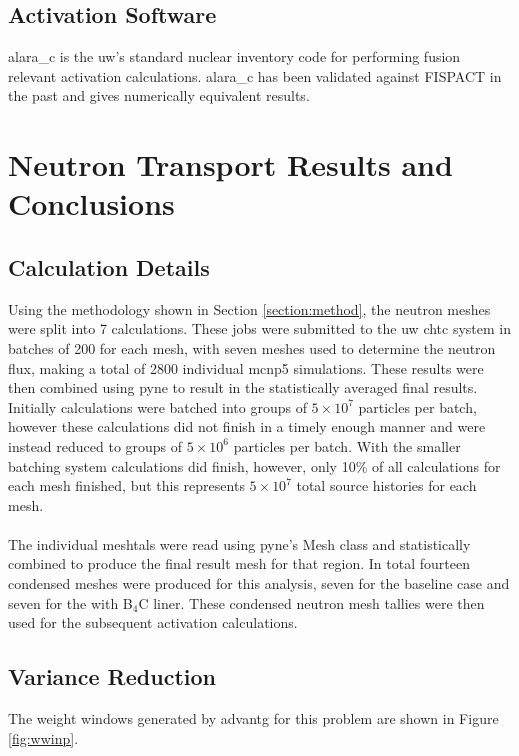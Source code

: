 \documentclass[12pt]{article}
\begin{document}
\subsection{Activation Software}
\gls{alara_c} is the \gls{uw}'s standard nuclear inventory code for performing
fusion relevant activation calculations. \gls{alara_c} has been validated against 
FISPACT \cite{fispact} in the past and gives numerically equivalent results. 

\newpage
\clearpage
\section{Neutron Transport Results and Conclusions}

\subsection{Calculation Details}
Using the methodology shown in Section \ref{section:method}, the neutron meshes
were split into 7 calculations. These jobs were submitted to the \gls{uw}
\gls{chtc} system in batches of 200 for each mesh, with seven meshes used to
determine the neutron flux, making a
total of 2800 individual \gls{mcnp5} simulations. These results were then
combined using \gls{pyne} to result in the statistically averaged final results.
Initially calculations were batched into groups of $5\times10^7$ particles per
batch, however these calculations did not finish in a timely enough manner and
were instead reduced to groups of $5\times10^6$ particles per batch. With the
smaller batching system calculations did finish, however, only 10\% of all
calculations for each mesh finished, but this represents $5\times10^7$ total
source histories for each mesh.
\\
\\
The individual meshtals were read using \gls{pyne}'s Mesh class and statistically
combined to produce the final result mesh for that region. In total fourteen 
condensed meshes were produced for this analysis, seven for the baseline case
and seven for the with B$_4$C liner. These condensed neutron mesh tallies were
then used for the subsequent activation calculations.

\subsection{Variance Reduction}
The weight windows generated by \gls{advantg} for this problem are shown in Figure
\ref{fig:wwinp}. 
\end{document}

